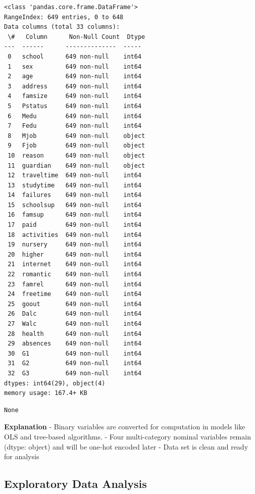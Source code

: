 \documentclass[9pt]{article}
\begin{document}
    
    \begin{Verbatim}[commandchars=\\\{\}]
<class 'pandas.core.frame.DataFrame'>
RangeIndex: 649 entries, 0 to 648
Data columns (total 33 columns):
 \#   Column      Non-Null Count  Dtype
---  ------      --------------  -----
 0   school      649 non-null    int64
 1   sex         649 non-null    int64
 2   age         649 non-null    int64
 3   address     649 non-null    int64
 4   famsize     649 non-null    int64
 5   Pstatus     649 non-null    int64
 6   Medu        649 non-null    int64
 7   Fedu        649 non-null    int64
 8   Mjob        649 non-null    object
 9   Fjob        649 non-null    object
 10  reason      649 non-null    object
 11  guardian    649 non-null    object
 12  traveltime  649 non-null    int64
 13  studytime   649 non-null    int64
 14  failures    649 non-null    int64
 15  schoolsup   649 non-null    int64
 16  famsup      649 non-null    int64
 17  paid        649 non-null    int64
 18  activities  649 non-null    int64
 19  nursery     649 non-null    int64
 20  higher      649 non-null    int64
 21  internet    649 non-null    int64
 22  romantic    649 non-null    int64
 23  famrel      649 non-null    int64
 24  freetime    649 non-null    int64
 25  goout       649 non-null    int64
 26  Dalc        649 non-null    int64
 27  Walc        649 non-null    int64
 28  health      649 non-null    int64
 29  absences    649 non-null    int64
 30  G1          649 non-null    int64
 31  G2          649 non-null    int64
 32  G3          649 non-null    int64
dtypes: int64(29), object(4)
memory usage: 167.4+ KB
    \end{Verbatim}

    
    \begin{Verbatim}[commandchars=\\\{\}]
None
    \end{Verbatim}

    
    \textbf{Explanation} - Binary variables are converted for computation in
models like OLS and tree-based algorithms. - Four multi-category nominal
variables remain (dtype: object) and will be one-hot encoded later -
Data set is clean and ready for analysis

    \hypertarget{exploratory-data-analysis}{%
\subsection{Exploratory Data Analysis}\label{exploratory-data-analysis}}
\end{document}

